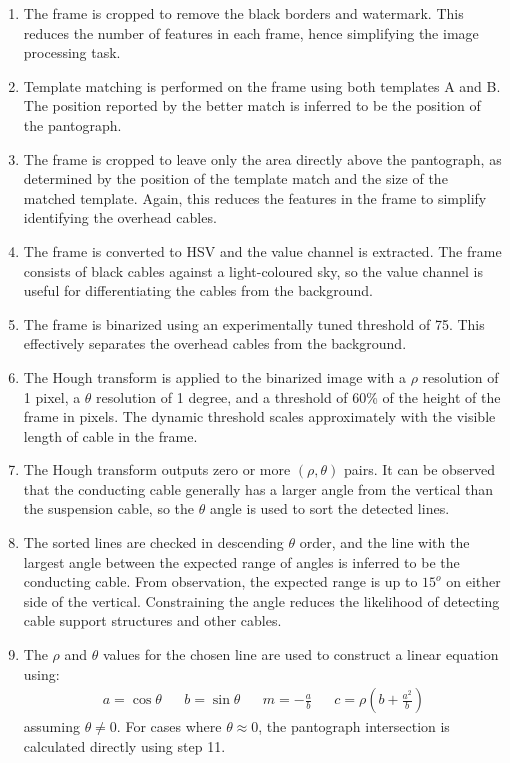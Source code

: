 \begin{enumerate}
  \item The frame is cropped to remove the black borders and watermark. This reduces the number of features in each frame, hence simplifying the image processing task.

  \item Template matching is performed on the frame using both templates A and B. The position reported by the better match is inferred to be the position of the pantograph.

  \item The frame is cropped to leave only the area directly above the pantograph, as determined by the position of the template match and the size of the matched template. Again, this reduces the features in the frame to simplify identifying the overhead cables.

  \item The frame is converted to HSV and the value channel is extracted. The frame consists of black cables against a light-coloured sky, so the value channel is useful for differentiating the cables from the background.

  \item The frame is binarized using an experimentally tuned threshold of 75. This effectively separates the overhead cables from the background.

  \item The Hough transform is applied to the binarized image with a $\rho$ resolution of 1 pixel, a $\theta$ resolution of 1 degree, and a threshold of 60\% of the height of the frame in pixels. The dynamic threshold scales approximately with the visible length of cable in the frame.

  \item The Hough transform outputs zero or more $(\rho,\theta)$ pairs. It can be observed that the conducting cable generally has a larger angle from the vertical than the suspension cable, so the $\theta$ angle is used to sort the detected lines.

  \item The sorted lines are checked in descending $\theta$ order, and the line with the largest angle between the expected range of angles is inferred to be the conducting cable. From observation, the expected range is up to $15^o$ on either side of the vertical. Constraining the angle reduces the likelihood of detecting cable support structures and other cables.

  \item The $\rho$ and $\theta$ values for the chosen line are used to construct a linear equation using:
  \begin{align}
    a = \cos\theta && b = \sin\theta && m = -\frac{a}{b} && c = \rho \left(b + \frac{a^2}{b}\right)
  \end{align}
  assuming $\theta \neq 0$. For cases where $\theta \approx 0$, the pantograph intersection is calculated directly using step 11.


\end{enumerate}
